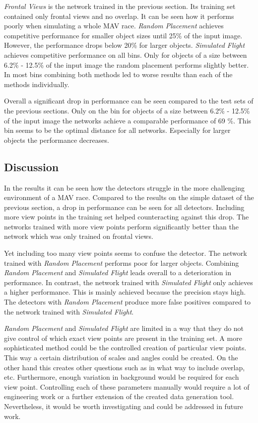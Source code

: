 \textit{Frontal Views} is the network trained in the previous section. Its training set contained only frontal views and no overlap. It can be seen how it performs poorly when simulating a whole \ac{MAV} race. \textit{Random Placement} achieves competitive performance for smaller object sizes until 25\% of the input image. However, the performance drops below 20\% for larger objects. \textit{Simulated Flight} achieves competitive performance on all bins. Only for objects of a size between 6.2\% - 12.5\% of the input image the random placement performs slightly better. In most bins combining both methods led to worse results than each of the methods individually.

Overall a significant drop in performance can be seen compared to the test sets of the previous sections. Only on the bin for objects of a size between 6.2\% - 12.5\% of the input image the networks achieve a comparable performance of 69 \%. This bin seems to be the optimal distance for all networks. Especially for larger objects the performance decreases.

\subsection{Discussion}

In the results it can be seen how the detectors struggle in the more challenging environment of a \ac{MAV} race. Compared to the results on the simple dataset of the previous section, a drop in performance can be seen for all detectors. Including more view points in the training set helped counteracting against this drop. The networks trained with more view points perform significantly better than the network which was only trained on frontal views.

Yet including too many view points seems to confuse the detector. The network trained with \textit{Random Placement} performs poor for larger objects. Combining \textit{Random Placement} and \textit{Simulated Flight} leads overall to a deterioration in performance. In contrast, the network trained with \textit{Simulated Flight} only achieves a higher performance. This is mainly achieved because the precision stays high. The detectors with \textit{Random Placement} produce more false positives compared to the network trained with \textit{Simulated Flight}.

\textit{Random Placement} and \textit{Simulated Flight} are limited in a way that they do not give control of which exact view points are present in the training set. A more sophisticated method could be the controlled creation of particular view points. This way a certain distribution of scales and angles could be created. On the other hand this creates other questions such as in what way to include overlap, etc. Furthermore, enough variation in background would be required for each view point. Controlling each of these parameters manually would require a lot of engineering work or a further extension of the created data generation tool. Nevertheless, it would be worth investigating and could be addressed in future work.

